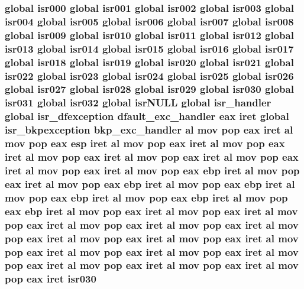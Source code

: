 \subsubsection[{\texorpdfstring{isr030}{isr030}}]{\setlength{\rightskip}{0pt plus 5cm}global {\bf isr000} global {\bf isr001} global {\bf isr002} global {\bf isr003} global {\bf isr004} global {\bf isr005} global {\bf isr006} global {\bf isr007} global {\bf isr008} global {\bf isr009} global {\bf isr010} global {\bf isr011} global {\bf isr012} global {\bf isr013} global {\bf isr014} global {\bf isr015} global {\bf isr016} global {\bf isr017} global {\bf isr018} global {\bf isr019} global {\bf isr020} global {\bf isr021} global {\bf isr022} global {\bf isr023} global {\bf isr024} global {\bf isr025} global {\bf isr026} global {\bf isr027} global {\bf isr028} global {\bf isr029} global isr030 global {\bf isr031} global isr032 global isr\+N\+U\+LL global isr\+\_\+handler global {\bf isr\+\_\+dfexception} {\bf dfault\+\_\+exc\+\_\+handler} eax iret global {\bf isr\+\_\+bkpexception} {\bf bkp\+\_\+exc\+\_\+handler} {\bf al} {\bf mov} pop eax iret {\bf al} {\bf mov} pop eax esp iret {\bf al} {\bf mov} pop eax iret {\bf al} {\bf mov} pop eax iret {\bf al} {\bf mov} pop eax iret {\bf al} {\bf mov} pop eax iret {\bf al} {\bf mov} pop eax iret {\bf al} {\bf mov} pop eax iret {\bf al} {\bf mov} pop eax ebp iret {\bf al} {\bf mov} pop eax iret {\bf al} {\bf mov} pop eax ebp iret {\bf al} {\bf mov} pop eax ebp iret {\bf al} {\bf mov} pop eax ebp iret {\bf al} {\bf mov} pop eax ebp iret {\bf al} {\bf mov} pop eax ebp iret {\bf al} {\bf mov} pop eax iret {\bf al} {\bf mov} pop eax iret {\bf al} {\bf mov} pop eax iret {\bf al} {\bf mov} pop eax iret {\bf al} {\bf mov} pop eax iret {\bf al} {\bf mov} pop eax iret {\bf al} {\bf mov} pop eax iret {\bf al} {\bf mov} pop eax iret {\bf al} {\bf mov} pop eax iret {\bf al} {\bf mov} pop eax iret {\bf al} {\bf mov} pop eax iret {\bf al} {\bf mov} pop eax iret {\bf al} {\bf mov} pop eax iret {\bf al} {\bf mov} pop eax iret {\bf al} {\bf mov} pop eax iret isr030}\hypertarget{isrs_8as_a3bb001408ffebf8424d81e377cf4f499}{}\label{isrs_8as_a3bb001408ffebf8424d81e377cf4f499}

